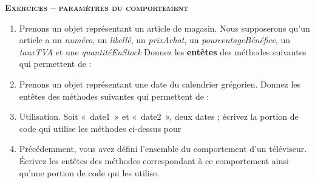 
\clearpage

{\sffamily\bfseries\scshape
Exercices – paramètres du comportement}

\begin{enumerate}
	\item 
		Prenons un objet représentant un article de magasin. 
		Nous supposerons qu'un article a un \textit{numéro}, un 
		\textit{libellé}, un \textit{prixAchat}, un
		\textit{pourcentageBénéfice}, un \textit{tauxTVA}
		et une \textit{quantitéEnStock}
		Donnez les \textbf{entêtes} des méthodes suivantes qui permettent de
		:

			
	\item 
		Prenons un objet représentant une date du calendrier grégorien. 
		Donnez les entêtes des méthodes suivantes qui permettent de
		:

		
	\item 
		Utilisation. Soit «~date1~» et «~date2~», deux dates ; écrivez la
		portion de code qui utilise les méthodes ci-dessus pour
		
	
	\item 
		Précédemment, vous avez défini l'ensemble du
		comportement d'un téléviseur. Écrivez les entêtes des
		méthodes correspondant à ce comportement ainsi qu'une
		portion de code qui les utilise.
\end{enumerate}

